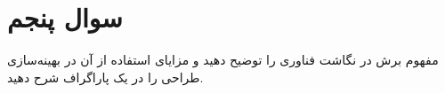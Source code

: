 \section{سوال پنجم}


مفهوم برش  در نگاشت فناوری  را توضیح دهید و مزایای استفاده از آن در بهینه‌سازی طراحی را در یک پاراگراف شرح دهید.